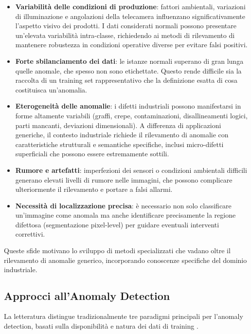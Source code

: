 \begin{itemize}
\item \textbf{Variabilità delle condizioni di produzione}: fattori ambientali, variazioni di illuminazione e angolazioni della telecamera influenzano significativamente l'aspetto visivo dei prodotti. I dati considerati normali possono presentare un'elevata variabilità intra-classe, richiedendo ai metodi di rilevamento di mantenere robustezza in condizioni operative diverse per evitare falsi positivi.

\item \textbf{Forte sbilanciamento dei dati}: le istanze normali superano di gran lunga quelle anomale, che spesso non sono etichettate. Questo rende difficile sia la raccolta di un training set rappresentativo che la definizione esatta di cosa costituisca un'anomalia.

\item \textbf{Eterogeneità delle anomalie}: i difetti industriali possono manifestarsi in forme altamente variabili (graffi, crepe, contaminazioni, disallineamenti logici, parti mancanti, deviazioni dimensionali). A differenza di applicazioni generiche, il contesto industriale richiede il rilevamento di anomalie con caratteristiche strutturali e semantiche specifiche, inclusi micro-difetti superficiali che possono essere estremamente sottili.

\item \textbf{Rumore e artefatti}: imperfezioni dei sensori o condizioni ambientali difficili generano elevati livelli di rumore nelle immagini, che possono complicare ulteriormente il rilevamento e portare a falsi allarmi.

\item \textbf{Necessità di localizzazione precisa}: è necessario non solo classificare un'immagine come anomala ma anche identificare precisamente la regione difettosa (segmentazione pixel-level) per guidare eventuali interventi correttivi.
\end{itemize}

Queste sfide motivano lo sviluppo di metodi specializzati che vadano oltre il rilevamento di anomalie generico, incorporando conoscenze specifiche del dominio industriale.

\subsection{Approcci all'Anomaly Detection}
La letteratura distingue tradizionalmente tre paradigmi principali per l'anomaly detection, basati sulla disponibilità e natura dei dati di training \cite{ruff2021anomaly, chalapathy2019deep}.

